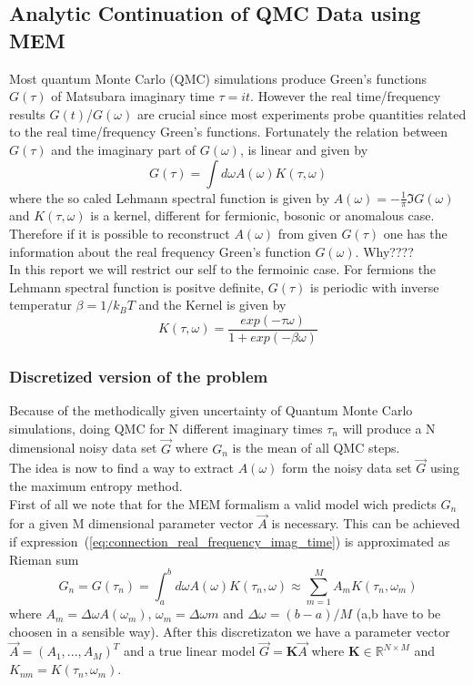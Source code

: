 \subsection{Analytic Continuation of QMC Data using MEM}

Most quantum Monte Carlo (QMC) simulations produce Green's functions $G(\tau)$ of Matsubara imaginary time $\tau = it$.
However the real time/frequency results $G(t)$/$G(\omega)$ are crucial since most experiments probe quantities related to 
the real time/frequency Green's functions. Fortunately the relation between $G(\tau)$ and the imaginary part of $G(\omega)$,
is linear and given by 
\begin{equation}\label{eq:connection_real_frequency_imag_time}
G(\tau) = \int d\omega A(\omega)K(\tau,\omega) 
\end{equation}
\noindent where the so caled Lehmann spectral function is given by $A(\omega) = -\frac{1}{\pi} \Im G(\omega)$ and $K(\tau,\omega)$ is a kernel, 
different for fermionic, bosonic or anomalous case. Therefore if it is possible to reconstruct $A(\omega)$ from given $G(\tau)$
one has the information about the real frequency Green's function $G(\omega)$. Why???? \\
In this report we will restrict our self to the fermoinic case. For fermions the Lehmann spectral function is positve 
definite, $G(\tau)$ is periodic with inverse temperatur $\beta = 1 / k_B T$ and the Kernel is given by
\begin{equation}\label{eq:ferminoc_kernel}
 K(\tau,\omega) =  \frac{exp(-\tau \omega)}{1 + exp(-\beta \omega)}
\end{equation}

\subsubsection{Discretized version of the problem}

\noindent Because of the methodically given uncertainty of Quantum Monte Carlo simulations, doing QMC for N different imaginary 
times $\tau_n$ will produce a N dimensional noisy data set $\vec{G}$ where $G_n$ is the mean of all QMC steps.\\
The idea is now to find a way to extract $A(\omega)$ form the noisy data set $\vec{G}$ using the maximum entropy method.\\
First of all we note that for the MEM formalism a valid model wich predicts $G_n$ for a given M dimensional parameter vector
$\vec{A}$ is necessary. This can be achieved if expression~(\ref{eq:connection_real_frequency_imag_time}) is approximated
as Rieman sum 
\begin{equation}
 G_n = G(\tau_n) = \int_{a}^{b} d \omega A(\omega)K(\tau_n,\omega) \approx \sum_{m=1}^M  A_m K(\tau_n,\omega_m)
\label{eq:kernel_as_reiman_sum}
\end{equation}
\noindent where $A_m = \Delta \omega A(\omega_m)$, $ \omega_m = \Delta \omega m$ and $\Delta \omega = (b-a)/M$ (a,b have to be choosen in a sensible way).
After this discretizaton we have a parameter vector $\vec{A} =(A_1,...,A_M)^T$ and a true linear model $\vec{G} = \textbf{K} 
\vec{A}$ where $\textbf{K} \in \mathbb{R}^{N\times M}$ and $K_{nm} = K(\tau_n,\omega_m)$.


